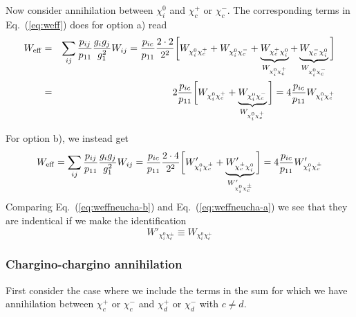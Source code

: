 Now consider annihilation between $\chi_{i}^0$ and $\chi_{c}^+$ or 
$\chi_{c}^-$. The corresponding terms in Eq.~(\ref{eq:weff}) does for 
option a) read
\begin{eqnarray}
    W_{\rm eff} & = & \sum_{ij}\frac{p_{ij}}{p_{11}} 
    \frac{g_{i}g_{j}}{g_{1}^2} W_{ij}
    =
    \frac{p_{ic}}{p_{11}} \frac{2 \cdot 2}{2^2}
    \bigg[ 
    W_{\chi_{i}^0 \chi_{c}^+} +
    W_{\chi_{i}^0 \chi_{c}^-} +
    \underbrace{W_{\chi_{c}^+ \chi_{i}^0}}_{W_{\chi_{i}^0 \chi_{c}^+}} +
    \underbrace{W_{\chi_{c}^- \chi_{i}^0}}_{W_{\chi_{i}^0 \chi_{c}^-}}
    \bigg] \nonumber \\
    & = & 2 \frac{p_{ic}}{p_{11}} 
    \bigg[
    W_{\chi_{i}^0 \chi_{c}^+} +
    \underbrace{W_{\chi_{i}^0 \chi_{c}^-}}_{W_{\chi_{i}^0 \chi_{c}^+}}
    \bigg]
    = 4 \frac{p_{ic}}{p_{11}} 
    W_{\chi_{i}^0 \chi_{c}^+}
    \label{eq:weffneucha-a}
\end{eqnarray}

For option b), we instead get
\begin{equation}
    W_{\rm eff} = \sum_{ij}\frac{p_{ij}}{p_{11}} 
    \frac{g_{i}g_{j}}{g_{1}^2} W_{ij}
    =
    \frac{p_{ic}}{p_{11}} \frac{2 \cdot 4}{2^2}
    \bigg[ 
    W'_{\chi_{i}^0 \chi_{c}^\pm} +
    \underbrace{W'_{\chi_{c}^\pm \chi_{i}^0}}_{W'_{\chi_{i}^0 \chi_{c}^\pm}}
    \bigg]
    =
    4 \frac{p_{ic}}{p_{11}} W'_{\chi_{i}^0 \chi_{c}^\pm}
    \label{eq:weffneucha-b}
\end{equation}
Comparing Eq.~(\ref{eq:weffneucha-b}) and Eq.~(\ref{eq:weffneucha-a}) 
we see that they are indentical if we make the identification
\begin{equation}
    W'_{\chi_{i}^0 \chi_{c}^\pm} \equiv W_{\chi_{i}^0 \chi_{c}^+}
\end{equation}

\subsubsection{Chargino-chargino annihilation}

First consider the case where we include the terms in the sum for 
which we have annihilation between $\chi_{c}^+$ or $\chi_{c}^-$ and 
$\chi_{d}^+$ or $\chi_{d}^-$ with $c \ne d$.

